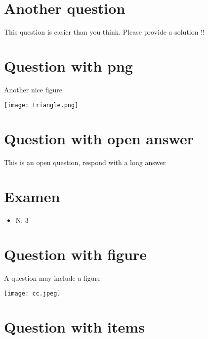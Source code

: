 \documentclass[a4paper,11pt,twoside]{article}
\begin{document}
\section*{Another question}
\label{sec:orgace33ee}

This question is easier than you think. Please provide a solution !!



\section*{Question with png}
\label{sec:org199a733}

Another nice figure

\begin{center}
\texttt{[image: triangle.png]}
\end{center}



\section*{Question with open answer}
\label{sec:org73a5b50}

This is an open question, respond with a long answer


\subsection*{}
\label{sec:org54a183e}

\cleardoublepage

\section*{Examen}
\label{sec:orgc5e53ae}
\begin{itemize}
\item N: 3
\end{itemize}
\section*{Question with figure}
\label{sec:org335198e}


A question may include a figure

\begin{center}
\texttt{[image: cc.jpeg]}
\end{center}



\section*{Question with items}
\label{sec:orgb33e65d}
\end{document}
